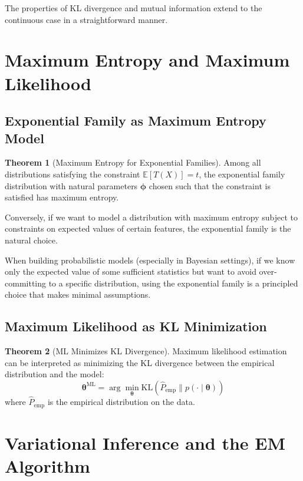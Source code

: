 \documentclass[12pt,a4paper]{article}
\theoremstyle{definition}
\newtheorem{theorem}{Theorem}[section]
\begin{document}
The properties of KL divergence and mutual information extend to the continuous case in a straightforward manner.

\section{Maximum Entropy and Maximum Likelihood}

\subsection{Exponential Family as Maximum Entropy Model}

\begin{theorem}[Maximum Entropy for Exponential Families]
Among all distributions satisfying the constraint $\mathbb{E}[T(X)] = t$, the exponential family distribution with natural parameters $\boldsymbol{\phi}$ chosen such that the constraint is satisfied has maximum entropy.

Conversely, if we want to model a distribution with maximum entropy subject to constraints on expected values of certain features, the exponential family is the natural choice.
\end{theorem}

When building probabilistic models (especially in Bayesian settings), if we know only the expected value of some sufficient statistics but want to avoid over-committing to a specific distribution, using the exponential family is a principled choice that makes minimal assumptions.

\subsection{Maximum Likelihood as KL Minimization}

\begin{theorem}[ML Minimizes KL Divergence]
Maximum likelihood estimation can be interpreted as minimizing the KL divergence between the empirical distribution and the model:
\[
\boldsymbol{\theta}^{\text{ML}} = \arg\min_{\boldsymbol{\theta}} \text{KL}(\hat{P}_{\text{emp}} \| p(\cdot \mid \boldsymbol{\theta}))
\]
where $\hat{P}_{\text{emp}}$ is the empirical distribution on the data.
\end{theorem}

\section{Variational Inference and the EM Algorithm}
\end{document}
